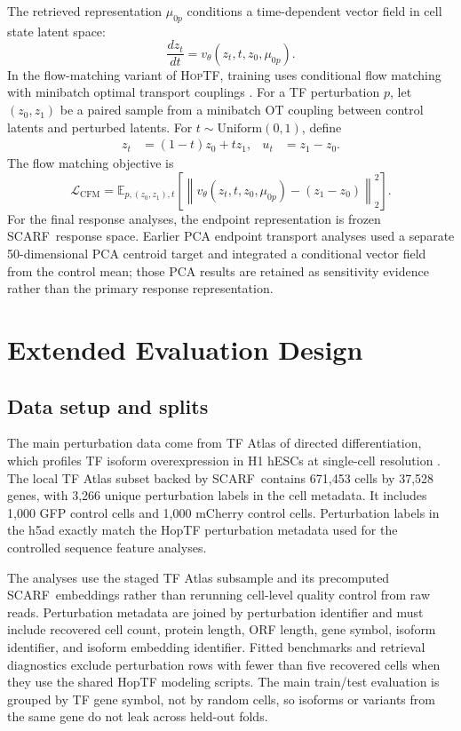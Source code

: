 \documentclass{article}
\newcommand{\hoptf}{\textsc{HopTF}}
\newcommand{\scarf}{\textsc{SCARF}}
\begin{document}
The retrieved representation \(\mu_{0p}\) conditions a time-dependent vector field in cell state latent space:
\begin{equation}
    \frac{d z_t}{dt} = v_\theta(z_t, t, z_0, \mu_{0p}).
\end{equation}
In the flow-matching variant of \hoptf, training uses conditional flow matching with minibatch optimal transport couplings \citep{tong2024cfm,tong2024sf2m}. For a TF perturbation \(p\), let \((z_0,z_1)\) be a paired sample from a minibatch OT coupling between control latents and perturbed latents. For \(t \sim \mathrm{Uniform}(0,1)\), define
\begin{align}
    z_t &= (1-t)z_0 + t z_1, &
    u_t &= z_1-z_0.
\end{align}
The flow matching objective is
\begin{equation}
    \mathcal{L}_{\mathrm{CFM}} =
    \mathbb{E}_{p,(z_0,z_1),t}\left[
    \left\|v_\theta(z_t,t,z_0,\mu_{0p}) - (z_1-z_0)\right\|_2^2
    \right].
\end{equation}
For the final response analyses, the endpoint representation is frozen \scarf\ response space. Earlier PCA endpoint transport analyses used a separate 50-dimensional PCA centroid target and integrated a conditional vector field from the control mean; those PCA results are retained as sensitivity evidence rather than the primary response representation.

\section{Extended Evaluation Design}
\label{app:comparison_design}

\subsection{Data setup and splits}

The main perturbation data come from TF Atlas of directed differentiation, which profiles TF isoform overexpression in H1 hESCs at single-cell resolution \citep{joung2023}. The local TF Atlas subset backed by \scarf\ contains 671,453 cells by 37,528 genes, with 3,266 unique perturbation labels in the cell metadata. It includes 1,000 GFP control cells and 1,000 mCherry control cells. Perturbation labels in the h5ad exactly match the HopTF perturbation metadata used for the controlled sequence feature analyses.

The analyses use the staged TF Atlas subsample and its precomputed \scarf\ embeddings rather than rerunning cell-level quality control from raw reads. Perturbation metadata are joined by perturbation identifier and must include recovered cell count, protein length, ORF length, gene symbol, isoform identifier, and isoform embedding identifier. Fitted benchmarks and retrieval diagnostics exclude perturbation rows with fewer than five recovered cells when they use the shared HopTF modeling scripts. The main train/test evaluation is grouped by TF gene symbol, not by random cells, so isoforms or variants from the same gene do not leak across held-out folds.
\end{document}
